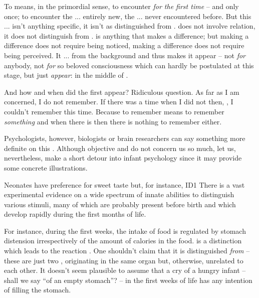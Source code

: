 To  means, in the primordial sense, to encounter {\em for the
  first time} -- and only once; to encounter the ... entirely new, the ... never
encountered before. But this ... isn't anything specific, it isn't  as distinguished from .  does
not involve relation, it does not distinguish  from .
 is anything that makes a difference; but making a difference
does not require being noticed, making a difference does not require being
perceived. It  ... from the background and thus makes it
appear -- not {\em for} anybody, not {\em for} so beloved consciousness which
can hardly be postulated at this stage, but just {\em appear}: in the middle of
.

 
And how and when did the first  appear? Ridiculous question.  As
far as I am concerned, I do not remember. If there was a time when I did not
 then, , I couldn't remember this time. Because
to remember means to remember {\em something} and when there is 
then there is nothing to remember either.

\pa\label{sub:stomach} Psychologists, however, biologists or brain researchers
can say something more definite on this . Although objective
 and  do not concern us so much, let us, nevertheless, make
a short detour into infant psychology since it may provide some concrete
illustrations.

Neonates have preference for sweet taste but, for instance, \citet{weak saline
  solutions are not found aversive, because they have been experienced before
  birth, as aminotic fluid.}{ID1}{} There is a vast experimental
evidence on a wide spectrum of innate abilities to distinguish various stimuli,
many of which are probably present before birth and which develop rapidly during
the first months of life.

For instance, during the first weeks, the intake of food is regulated by stomach
distension irrespectively of the amount of calories in the food.  is a distinction which leads to the reaction . One
shouldn't claim that it is distinguished {\em from}  -- these
are just two , originating in the same organ but, otherwise,
unrelated to each other. It doesn't seem plausible to assume that a cry of a
hungry infant -- shall we say ``of an empty stomach''? -- in the first weeks of
life has any intention of filling the stomach.

